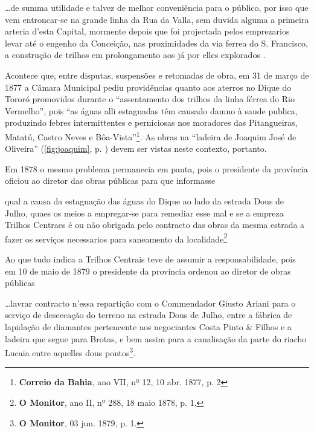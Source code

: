 \begin{citacao}
\dots de summa utilidade e talvez de melhor conveniência para o público, por isso que vem entroncar-se na grande linha da Rua da Valla, sem duvida alguma a primeira arteria d'esta Capital, mormente depois que foi projectada pelos emprezarios levar até o engenho da Conceição, nas proximidades da via ferrea do S. Francisco, a construção de trilhos em prolongamento aos já por elles explorados \cite[p.~169]{bahia_rpe_1874}.
\end{citacao}

Acontece que, entre disputas, suspensões e retomadas de obra, em 31 de março de 1877 a Câmara Municipal pediu providências quanto aos aterros no Dique do Tororó promovidos durante o ``assentamento dos trilhos da linha férrea do Rio Vermelho'', pois ``as águas alli estagnadas têm causado damno à saude publica, produzindo febres intermittentes e perniciosas nos moradores das Pitangueiras, Matatú, Castro Neves e Bôa-Vista''\footnote{\textbf{Correio da Bahia}, ano VII, nº 12, 10 abr. 1877, p. 2}. As obras na ``ladeira de Joaquim José de Oliveira'' (\autoref{fig:joaquim}, p. \pageref{fig:joaquim}) devem ser vistas neste contexto, portanto. 

Em 1878 o mesmo problema permanecia em pauta, pois o presidente da província oficiou ao diretor das obras públicas para que informasse 

\begin{citacao}
qual a causa da estagnação das águas do Dique ao lado da estrada Dous de Julho, quaes os meios a empregar-se para remediar esse mal e se a empreza Trilhos Centraes é ou não obrigada pelo contracto das obras da mesma estrada a fazer os serviços necessarios para saneamento da localidade\footnote{\textbf{O Monitor}, ano II, nº 288, 18 maio 1878, p. 1.}
\end{citacao}

Ao que tudo indica a Trilhos Centrais teve de assumir a responsabilidade, pois em 10 de maio de 1879 o presidente da província ordenou ao diretor de obras públicas 

\begin{citacao}
\dots lavrar contracto n'essa repartição com o Commendador Giusto Ariani para o serviço de deseccação do terreno na estrada Dous de Julho, entre a fábrica de lapidação de diamantes pertencente aos negociantes Costa Pinto \& Filhos e a ladeira que segue para Brotas, e bem assim para a canalisação da parte do riacho Lucaia entre aquelles dous pontos\footnote{\textbf{O Monitor}, 03 jun. 1879, p. 1.}.
\end{citacao}

